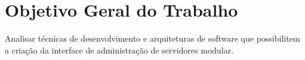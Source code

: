 \section{Objetivo Geral do Trabalho}

  Analisar técnicas de desenvolvimento e arquiteturas de software que
  possibilitem a criação da interface de administração de servidores modular.
